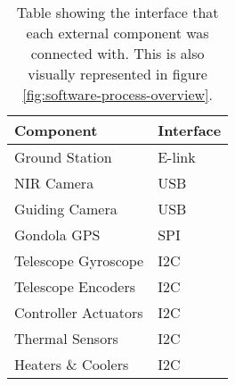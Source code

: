\begin{table}[H]
	\centering
	\begin{tabular}{l|l}
		\textbf{Component}
		& \textbf{Interface} \\ \hline
		Ground Station
		& E-link             \\
		NIR Camera
		& USB                \\
		Guiding Camera
		& USB                \\
		Gondola GPS
		& SPI                \\
		Telescope Gyroscope
		& I2C                \\
		Telescope Encoders
		& I2C                \\
		Controller Actuators
		& I2C                \\
		Thermal Sensors
		& I2C				 \\
		Heaters \& Coolers
		& I2C
	\end{tabular}
	\caption{Table showing the interface that each external component was connected with. This is also visually represented in figure \ref{fig:software-process-overview}.}
	\label{tab:software-interfaces}
\end{table}
